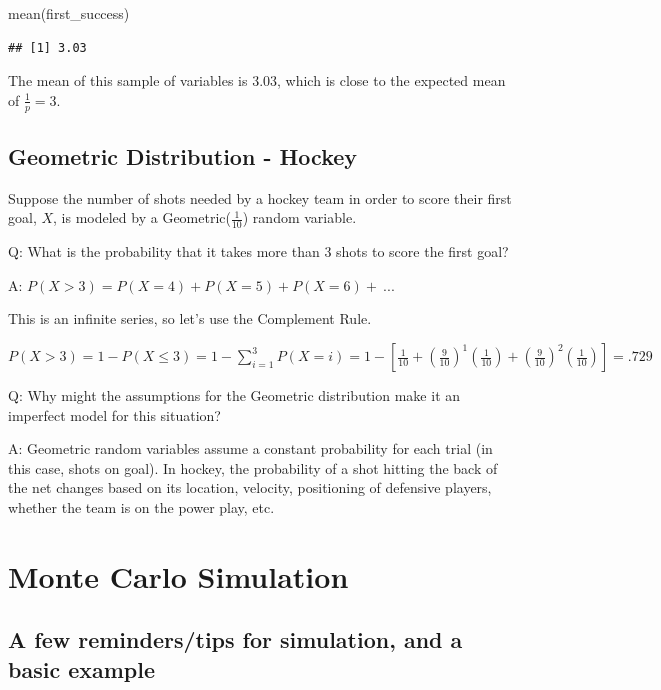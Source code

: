 \documentclass[
  11pt,
]{book}
\newenvironment{Shaded}{\begin{snugshade}}{\end{snugshade}}
\newcommand{\FunctionTok}[1]{\textcolor[rgb]{0.00,0.00,0.00}{#1}}
\newcommand{\NormalTok}[1]{#1}
\theoremstyle{definition}
\theoremstyle{definition}
\theoremstyle{definition}
\theoremstyle{definition}
\theoremstyle{remark}
\begin{document}
\begin{Shaded}
\begin{Highlighting}[]
\FunctionTok{mean}\NormalTok{(first\_success)}
\end{Highlighting}
\end{Shaded}

\begin{verbatim}
## [1] 3.03
\end{verbatim}

The mean of this sample of variables is 3.03, which is close to the expected mean of \(\frac{1}{p} = 3\).

\hypertarget{geometric-distribution---hockey-1}{%
\section{Geometric Distribution - Hockey}\label{geometric-distribution---hockey-1}}

Suppose the number of shots needed by a hockey team in order to score their first goal, \(X\), is modeled by a Geometric(\(\frac{1}{10}\)) random variable.

Q: What is the probability that it takes more than 3 shots to score the first goal?

A: \(P(X > 3) = P(X = 4) + P(X = 5) + P(X = 6) +\ ...\)

This is an infinite series, so let's use the Complement Rule.

\(P(X > 3) = 1 - P(X \leq 3) = 1 - \sum_{i=1}^{3}P(X = i) = 1 - [\frac{1}{10} + (\frac{9}{10})^1(\frac{1}{10}) + (\frac{9}{10})^2(\frac{1}{10})] = .729\)

Q: Why might the assumptions for the Geometric distribution make it an imperfect model for this situation?

A: Geometric random variables assume a constant probability for each trial (in this case, shots on goal). In hockey, the probability of a shot hitting the back of the net changes based on its location, velocity, positioning of defensive players, whether the team is on the power play, etc.

\hypertarget{monte-carlo-simulation}{%
\chapter{Monte Carlo Simulation}\label{monte-carlo-simulation}}

\hypertarget{a-few-reminderstips-for-simulation-and-a-basic-example}{%
\section{A few reminders/tips for simulation, and a basic example}\label{a-few-reminderstips-for-simulation-and-a-basic-example}}
\end{document}
